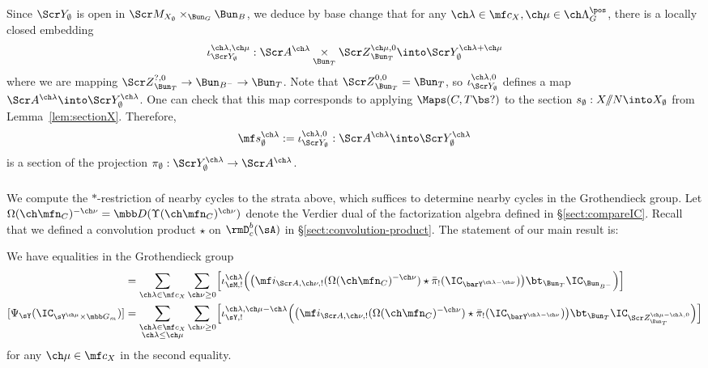 Since $\Scr Y_\emptyset$ is open in $\Scr M_{X_\emptyset}\times_{\Bun_G} \Bun_B$, we deduce by base change that for any $\ch\lambda\in \mf c_X, \ch\mu\in \ch\Lambda^\pos_G$,
there is a locally closed embedding
\[ \iota_{\Scr Y_\emptyset}^{\ch\lambda,\ch\mu} : \Scr A^{\ch\lambda}\underset{\Bun_T}\times {\Scr Z}_{\Bun_T}^{\ch\mu,0} \into \Scr Y_\emptyset^{\ch\lambda+\ch\mu} \]
where we are mapping ${\Scr Z}^{?,0}_{\Bun_T} \to \Bun_{B^-} \to \Bun_T$.
Note that ${\Scr Z}^{0,0}_{\Bun_T} = \Bun_T$, so
$\iota^{\ch\lambda,0}_{\Scr Y_\emptyset}$ defines a map
$\Scr A^{\ch\lambda} \into \Scr Y^{\ch\lambda}_\emptyset$.
One can check that this map corresponds to applying $\Maps(C,T\bs ?)$ to
the section $s_\emptyset : X/\!\!/N \into X_\emptyset$
from Lemma~\ref{lem:sectionX}.
Therefore,
\[ \mf s_\emptyset^{\ch\lambda} := \iota^{\ch\lambda,0}_{\Scr Y_\emptyset} : \Scr A^{\ch\lambda} \into \Scr Y^{\ch\lambda}_{\emptyset} \]
is a section of the projection $\pi_\emptyset : \Scr Y^{\ch\lambda}_\emptyset \to \Scr A^{\ch\lambda}$.


\subsubsection{}
We compute the $*$-restriction of nearby cycles to the strata above, which
suffices to determine nearby cycles in the Grothendieck group.
Let $\Omega(\ch\mfn_C)^{-\ch\nu} = \mbb D (\Upsilon(\ch\mfn_C)^{\ch\nu})$
denote the Verdier dual of the factorization algebra defined in \S\ref{sect:compareIC}.
Recall that we defined a convolution product $\star$ on $\rmD^b_c(\sA)$ in \S\ref{sect:convolution-product}.
The statement of our main result is:

\begin{thm}
\notready \label{thm:nearby}
We have equalities in the Grothendieck group
\begin{align*}
[\Psi_\sM(\IC_{\sM_X \times \mbb G_m})] &=
\sum_{\ch\lambda\in \mf c_X} \sum_{\ch\nu\ge 0}
\Bigl[ \iota^{\ch\lambda}_{\sM,!}\Bigl( \bigl(\mf i_{\Scr A,\ch\nu,!}(\Omega(\ch\mfn_C)^{-\ch\nu}) \star \bar\pi_!(\IC_{\barY^{\ch\lambda-\ch\nu}}) \bigr) \bt_{\Bun_T} \IC_{\Bun_{B^-}} \Bigr) \Bigr] \\
[\Psi_\sY(\IC_{\sY^{\ch\mu} \times \mbb G_m})] &=
\sum_{\substack{\ch\lambda\in \mf c_X\\ \ch\lambda \le \ch\mu}} \sum_{\ch\nu\ge 0}
\Bigl[ \iota^{\ch\lambda,\ch\mu-\ch\lambda}_{\sY,!}\Bigl(\bigl(\mf i_{\Scr A,\ch\nu,!}(\Omega(\ch\mfn_C)^{-\ch\nu}) \star \bar\pi_!(\IC_{\barY^{\ch\lambda-\ch\nu}}) \bigr) \bt_{\Bun_T} \IC_{\Scr Z^{\ch\mu-\ch\lambda,0}_{\Bun_T}} \Bigr) \Bigr]
\end{align*}
for any $\ch\mu\in \mf c_X$ in the second equality.
\end{thm}


